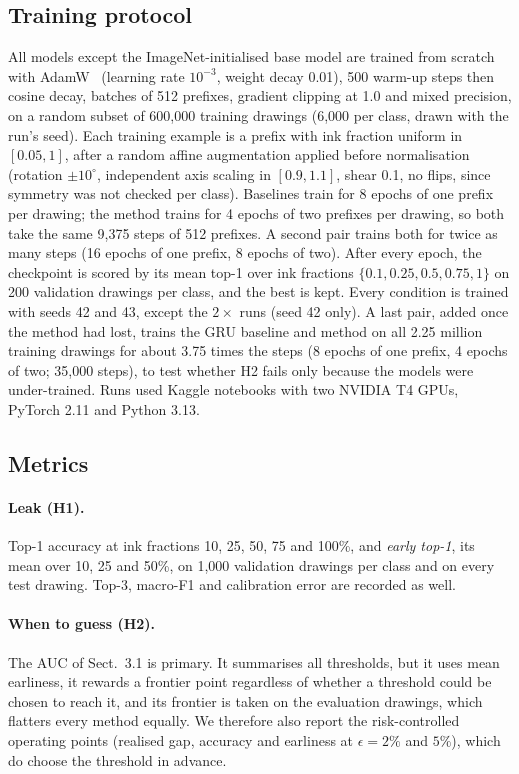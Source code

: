 \subsection{Training protocol}
\label{sec:setup-train}
All models except the ImageNet-initialised base model are trained from scratch with AdamW~\cite{loshchilov2019adamw} (learning rate
$10^{-3}$, weight decay 0.01), 500 warm-up steps then cosine decay, batches of 512 prefixes,
gradient clipping at 1.0 and mixed precision, on a random subset of 600{,}000 training
drawings (6{,}000 per class, drawn with the run's seed). Each training example is a prefix with ink fraction uniform in
$[0.05, 1]$, after a random affine augmentation applied before normalisation (rotation
$\pm10^\circ$, independent axis scaling in $[0.9, 1.1]$, shear 0.1, no flips, since symmetry was
not checked per class). Baselines train for 8 epochs of one prefix per drawing; the method trains
for 4 epochs of two prefixes per drawing, so both take the same 9{,}375 steps of 512 prefixes. A
second pair trains both for twice as many steps (16 epochs of one prefix, 8 epochs of two). After
every epoch, the checkpoint is scored by its mean top-1 over ink fractions
$\{0.1, 0.25, 0.5, 0.75, 1\}$ on 200 validation drawings per class, and the best is kept. Every
condition is trained with seeds 42 and 43, except the $2\times$ runs (seed 42 only). A last pair,
added once the method had lost, trains the GRU baseline and method on all 2.25 million training
drawings for about 3.75 times the steps (8 epochs of one prefix, 4 epochs of two; 35{,}000 steps),
to test whether H2 fails only because the models were under-trained. Runs used
Kaggle notebooks with two NVIDIA T4 GPUs, PyTorch 2.11 and Python 3.13.

\subsection{Metrics}
\label{sec:setup-metrics}
\paragraph{Leak (H1).} Top-1 accuracy at ink fractions 10, 25, 50, 75 and 100\%, and \emph{early
top-1}, its mean over 10, 25 and 50\%, on 1{,}000 validation drawings per class and on every test
drawing. Top-3, macro-F1 and calibration error are recorded as well.
\paragraph{When to guess (H2).} The AUC of Sect.~3.1 is primary. It summarises all thresholds, but
it uses mean earliness, it rewards a frontier point regardless of whether a threshold could be
chosen to reach it, and its frontier is taken on the evaluation drawings, which flatters every
method equally. We therefore also report the risk-controlled operating points (realised gap,
accuracy and earliness at $\epsilon = 2\%$ and $5\%$), which do choose the threshold in advance.
